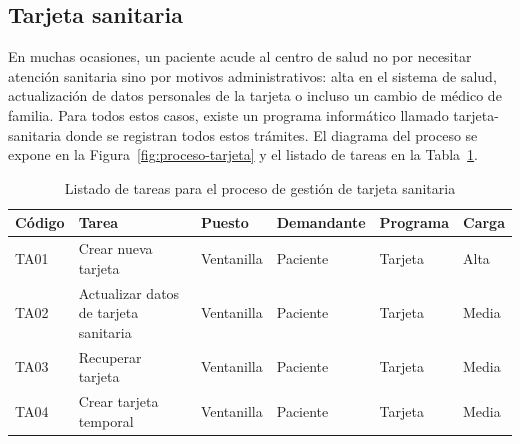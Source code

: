 




\subsection{Tarjeta sanitaria}

En muchas ocasiones, un paciente acude al centro de salud no por necesitar atención sanitaria sino por motivos administrativos: alta en el sistema de salud, actualización de datos personales de la tarjeta o incluso un cambio de médico de familia. Para todos estos casos, existe un programa informático llamado \Gls{tarjeta-sanitaria} donde se registran todos estos trámites. El diagrama del proceso se expone en la Figura~\ref{fig:proceso-tarjeta} y el listado de tareas en la Tabla~\ref{tab:proceso-tarjeta}.

\begin{table}[H]
    \begin{tabular}{lp{5cm}llll}
        \toprule
        Código & Tarea                                 & Puesto     & Demandante & Programa & Carga \\
        \midrule
        TA01   & Crear nueva tarjeta                   & Ventanilla & Paciente   & Tarjeta  & Alta  \\
        TA02   & Actualizar datos de tarjeta sanitaria & Ventanilla & Paciente   & Tarjeta  & Media \\
        TA03   & Recuperar tarjeta                     & Ventanilla & Paciente   & Tarjeta  & Media \\
        TA04   & Crear tarjeta temporal                & Ventanilla & Paciente   & Tarjeta  & Media \\
        \bottomrule
    \end{tabular}
    \caption{Listado de tareas para el proceso de gestión de tarjeta sanitaria}
    \label{tab:proceso-tarjeta}
\end{table}

